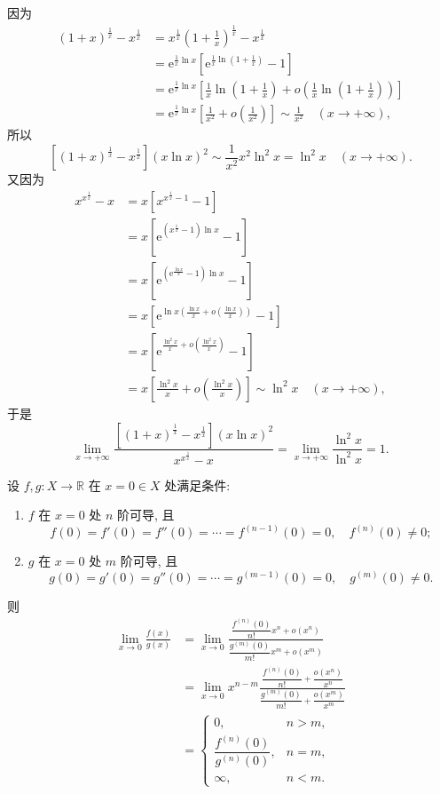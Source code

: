 \begin{solution}
因为
\begin{align*}
(1+x)^{\frac{1}{x}}-x^{\frac{1}{x}}
&= x^{\frac{1}{x}}\left(1+\frac{1}{x}\right)^{\frac{1}{x}}-x^{\frac{1}{x}} \\
&= \mathrm{e}^{\frac{1}{x}\ln x}\left[\mathrm{e}^{\frac{1}{x}\ln\left(1+\frac{1}{x}\right)}-1\right] \\
&= \mathrm{e}^{\frac{1}{x}\ln x}\left[\frac{1}{x}\ln\left(1+\frac{1}{x}\right)+o\left(\frac{1}{x}\ln\left(1+\frac{1}{x}\right)\right)\right] \\
&= \mathrm{e}^{\frac{1}{x}\ln x}\left[\frac{1}{x^{2}}+o\left(\frac{1}{x^{2}}\right)\right]\sim\frac{1}{x^{2}}\quad (x\to+\infty),
\end{align*}
所以
\[
\left[(1+x)^{\frac{1}{x}}-x^{\frac{1}{x}}\right](x\ln x)^{2}\sim\frac{1}{x^{2}}x^{2}\ln^{2}x=\ln^{2}x\quad (x\to+\infty).
\]
又因为
\begin{align*}
x^{x^{\frac{1}{x}}}-x
&= x\left[x^{x^{\frac{1}{x}}-1}-1\right] \\
&= x\left[\mathrm{e}^{\left(x^{\frac{1}{x}}-1\right)\ln x}-1\right] \\
&= x\left[\mathrm{e}^{\left(\mathrm{e}^{\frac{\ln x}{x}}-1\right)\ln x}-1\right] \\
&= x\left[\mathrm{e}^{\ln x\left(\frac{\ln x}{x}+o\left(\frac{\ln x}{x}\right)\right)}-1\right] \\
&= x\left[\mathrm{e}^{\frac{\ln^{2}x}{x}+o\left(\frac{\ln^{2}x}{x}\right)}-1\right] \\
&= x\left[\frac{\ln^{2}x}{x}+o\left(\frac{\ln^{2}x}{x}\right)\right]\sim\ln^{2}x\quad (x\to+\infty),
\end{align*}
于是
\[
\lim_{x\to+\infty}\frac{\left[(1+x)^{\frac{1}{x}}-x^{\frac{1}{x}}\right](x\ln x)^{2}}{x^{x^{\frac{1}{x}}}-x}
=\lim_{x\to+\infty}\frac{\ln^{2}x}{\ln^{2}x}=1.
\]
\end{solution}

\begin{example}\label{ex:4.2.7}
设 $f, g\colon X \to \mathbb{R}$ 在 $x=0 \in X$ 处满足条件:
\begin{enumerate}[label=(\arabic*)]
  \item $f$ 在 $x=0$ 处 $n$ 阶可导, 且
  \[
  f(0)=f'(0)=f''(0)=\cdots=f^{(n-1)}(0)=0,\quad f^{(n)}(0)\neq 0;
\]
  \item $g$ 在 $x=0$ 处 $m$ 阶可导, 且
  \[
  g(0)=g'(0)=g''(0)=\cdots=g^{(m-1)}(0)=0,\quad g^{(m)}(0)\neq 0.
\]
\end{enumerate}
则
\begin{align*}
\lim_{x\to 0}\frac{f(x)}{g(x)}
&= \lim_{x\to 0}\frac{\dfrac{f^{(n)}(0)}{n!}x^n+o(x^n)}{\dfrac{g^{(m)}(0)}{m!}x^m+o(x^m)} \\
&= \lim_{x\to 0}x^{n-m}\frac{\dfrac{f^{(n)}(0)}{n!}+\dfrac{o(x^n)}{x^n}}{\dfrac{g^{(m)}(0)}{m!}+\dfrac{o(x^m)}{x^m}} \\
&= \begin{cases}
0, & n>m, \\
\dfrac{f^{(n)}(0)}{g^{(n)}(0)}, & n=m, \\
\infty, & n<m.
\end{cases}
\end{align*}
\end{example}


